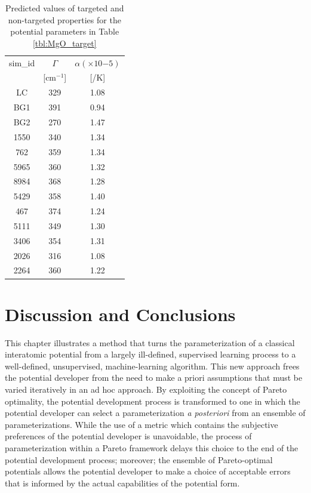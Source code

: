\begin{table}
	\caption{Predicted values of targeted and non-targeted properties for the potential parameters in Table \ref{tbl:MgO_target}}
	\label{tbl:MgO_best_testing_qoi}	\centering
		\begin{tabular}{ccc}
			\hline
		  sim\_id &$\Gamma$ & $\alpha(\times 10{-5})$ \\
			        & [$\text{cm}^{-1}$] & [/K] \\
		  \hline
			LC   & 329  & 1.08 \\
			BG1  & 391	& 0.94 \\
			BG2  & 270  & 1.47 \\
			1550 & 340	& 1.34 \\
			762  & 359  & 1.34 \\
			5965 & 360  & 1.32 \\
			8984 & 368  & 1.28 \\
			5429 & 358	& 1.40 \\
			467  & 374	& 1.24 \\
			5111 & 349  & 1.30 \\
			3406 & 354	& 1.31 \\
			2026 & 316  & 1.08 \\
			2264 & 360  & 1.22 \\
			\hline
		\end{tabular}
\end{table}

\section{Discussion and Conclusions}
This chapter illustrates a method that turns the parameterization of a classical interatomic potential from a largely ill-defined, supervised learning process to a well-defined, unsupervised, machine-learning algorithm.  This new approach frees the potential developer from the need to make a priori assumptions that must be varied iteratively in an ad hoc approach.  By exploiting the concept of Pareto optimality, the potential development process is transformed to one in which the potential developer can select a parameterization \emph{a posteriori} from an ensemble of parameterizations. While the use of a metric which contains the subjective preferences of the potential developer is unavoidable, the process of parameterization within a Pareto framework delays this choice to the end of the potential development process; moreover; the ensemble of Pareto-optimal potentials allows the potential developer to make a choice of acceptable errors that is informed by the actual capabilities of the potential form.

